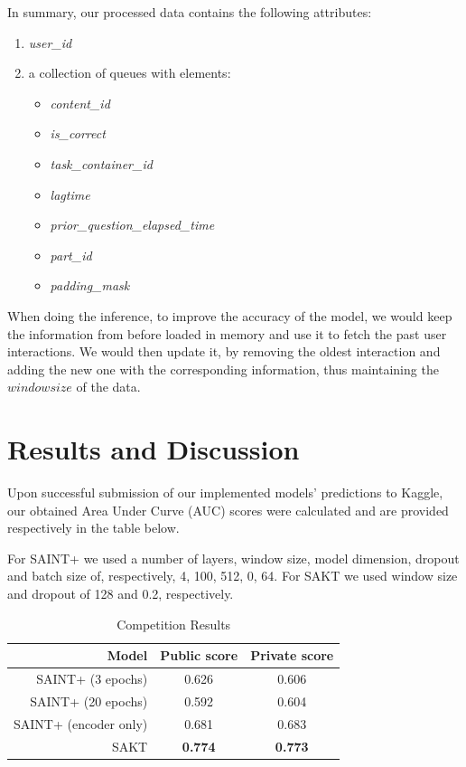 \documentclass{article}
\begin{document}
In summary, our processed data contains the following attributes:
\begin{enumerate}
    \item \textit{user\_id}
    \item a collection of queues with elements:
    \begin{itemize}
        \item \textit{content\_id}
        \item \textit{is\_correct}
        \item \textit{task\_container\_id}
        \item \textit{lagtime}
        \item \textit{prior\_question\_elapsed\_time}
        \item \textit{part\_id}
        \item \textit{padding\_mask}
    \end{itemize}
\end{enumerate}

When doing the inference, to improve the accuracy of the model, we would keep the information from before loaded in memory and use it to fetch the past user interactions. We would then update it, by removing the oldest interaction and adding the new one with the corresponding information, thus maintaining the $windowsize$ of the data.

\section{Results and Discussion}
Upon successful submission of our implemented models' predictions to Kaggle, our obtained Area Under Curve (AUC) scores were calculated and are provided respectively in the table below. 

For SAINT+ we used a number of layers, window size, model dimension, dropout and batch size of, respectively, 4, 100, 512, 0, 64. For SAKT we used window size and dropout of 128 and 0.2, respectively.

\begin{table}[h]
    \centering
    \begin{tabular}{|r|c|c|}
    \hline
        Model & Public score & Private score \\
        \hline
        SAINT+ (3 epochs) & 0.626 & 0.606 \\
        \hline
        SAINT+ (20 epochs) & 0.592 & 0.604\\
        \hline
        SAINT+ (encoder only) & 0.681 & 0.683\\
        \hline
        SAKT & \textbf{0.774} & \textbf{0.773}\\
        \hline
    \end{tabular}
    \vspace{0.2cm}
    \caption{Competition Results}
    \label{tab:results}
\end{table}
\end{document}
